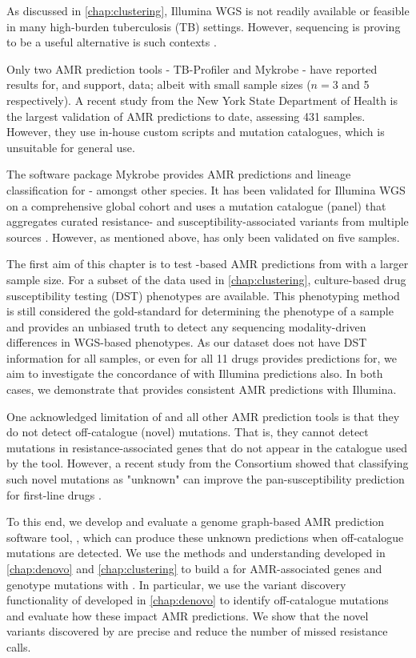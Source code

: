 As discussed in \autoref{chap:clustering}, Illumina WGS is not readily available or feasible in many high-burden tuberculosis (TB) settings. However, \ont{} sequencing is proving to be a useful alternative is such contexts \cite{Inzaule2021,faria2016,quick2016,who-ngs2018}. 

Only two \mtb{} AMR prediction tools - TB-Profiler \cite{phelan2019} and Mykrobe \cite{hunt2019} - have reported results for, and support, \ont{} data; albeit with small sample sizes ($n=3$ and 5 respectively). A recent study from the New York State Department of Health is the largest validation of \ont{} AMR predictions to date, assessing 431 samples. However, they use in-house custom scripts and mutation catalogues, which is unsuitable for general use. 

The software package Mykrobe provides AMR predictions and lineage classification for \mtb{} - amongst other species. It has been validated for Illumina WGS on a comprehensive global cohort and uses a mutation catalogue (panel) that aggregates curated resistance- and susceptibility-associated variants from multiple sources \cite{hunt2019}. However, as mentioned above, \mykrobe{} has only been validated on five \ont{} samples.

The first aim of this chapter is to test \ont{}-based AMR predictions from \mykrobe{} with a larger sample size. For a subset of the data used in \autoref{chap:clustering}, culture-based drug susceptibility testing (DST) phenotypes are available. This phenotyping method is still considered the gold-standard for determining the phenotype of a sample and provides an unbiased truth to detect any sequencing modality-driven differences in WGS-based phenotypes. As our dataset does not have DST information for all samples, or even for all 11 drugs \mykrobe{} provides predictions for, we aim to investigate the concordance of \ont{} with Illumina predictions also. In both cases, we demonstrate that \ont{} provides consistent AMR predictions with Illumina.

One acknowledged limitation of \mykrobe{} and all other \mtb{} AMR prediction tools is that they do not detect off-catalogue (novel) mutations. That is, they cannot detect mutations in resistance-associated genes that do not appear in the catalogue used by the tool. However, a recent study from the \cryptic{} Consortium showed that classifying such novel mutations as "unknown" can improve the pan-susceptibility prediction for first-line drugs \cite{cryptic2018}. 

To this end, we develop and evaluate a genome graph-based \mtb{} AMR prediction software tool, \drprg{}, which can produce these unknown predictions when off-catalogue mutations are detected. We use the methods and understanding developed in \autoref{chap:denovo} and \autoref{chap:clustering} to build a \mtb{} \prg{} for AMR-associated genes and genotype mutations with \pandora{}. In particular, we use the \denovo{} variant discovery functionality of \pandora{} developed in \autoref{chap:denovo} to identify off-catalogue mutations and evaluate how these impact AMR predictions. We show that the novel variants discovered by \drprg{} are precise and reduce the number of missed resistance calls.

